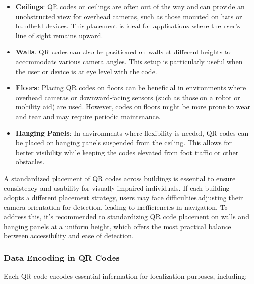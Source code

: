 \begin{itemize}
	\item \textbf{Ceilings}: QR codes on ceilings are often out of the way and can provide an unobstructed view for overhead cameras, such as those mounted on hats or handheld devices. This placement is ideal for applications where the user’s line of sight remains upward.
	
	\item \textbf{Walls}: QR codes can also be positioned on walls at different heights to accommodate various camera angles. This setup is particularly useful when the user or device is at eye level with the code.
	
	\item \textbf{Floors}: Placing QR codes on floors can be beneficial in environments where overhead cameras or downward-facing sensors (such as those on a robot or mobility aid) are used. However, codes on floors might be more prone to wear and tear and may require periodic maintenance.
	
	\item \textbf{Hanging Panels}: In environments where flexibility is needed, QR codes can be placed on hanging panels suspended from the ceiling. This allows for better visibility while keeping the codes elevated from foot traffic or other obstacles.
\end{itemize}

A standardized placement of QR codes across buildings is essential to ensure consistency and usability for visually impaired individuals. If each building adopts a different placement strategy, users may face difficulties adjusting their camera orientation for detection, leading to inefficiencies in navigation. To address this, it's recommended to standardizing QR code placement on walls and hanging panels at a uniform height, which offers the most practical balance between accessibility and ease of detection.






\subsubsection{Data Encoding in QR Codes}

Each QR code encodes essential information for localization purposes, including:

